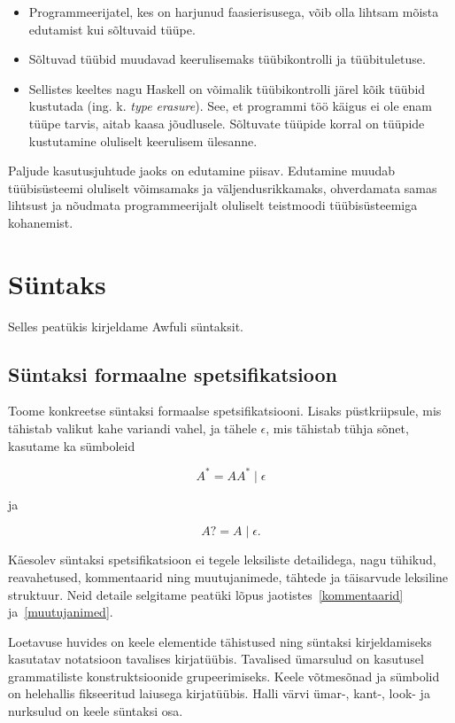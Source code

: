 \documentclass[12pt]{article}
\newcommand\peatykk[1]{
  \clearpage
  \section{#1}}
\begin{document}
      \begin{itemize}
        \item
          Programmeerijatel, kes on harjunud faasierisusega, võib olla lihtsam mõista edutamist kui sõltuvaid tüüpe.
        \item
          Sõltuvad tüübid muudavad keerulisemaks tüübikontrolli ja tüübituletuse.
        \item
          Sellistes keeltes nagu Haskell on võimalik tüübikontrolli järel kõik tüübid kustutada (ing. k. \textit{type erasure}). See, et programmi töö käigus ei ole enam tüüpe tarvis, aitab kaasa jõudlusele. Sõltuvate tüüpide korral on tüüpide kustutamine oluliselt keerulisem ülesanne.
      \end{itemize}

      Paljude kasutusjuhtude jaoks on edutamine piisav. Edutamine muudab tüübisüsteemi oluliselt võimsamaks ja väljendusrikkamaks, ohverdamata samas lihtsust ja nõudmata programmeerijalt oluliselt teistmoodi tüübisüsteemiga kohanemist.
  \peatykk{Süntaks}\label{syntaks}
    Selles peatükis kirjeldame Awfuli süntaksit.
    \subsection{Süntaksi formaalne spetsifikatsioon}
      Toome konkreetse süntaksi formaalse spetsifikatsiooni. Lisaks püstkriipsule, mis tähistab valikut kahe variandi vahel, ja tähele $\epsilon$, mis tähistab tühja sõnet, kasutame ka sümboleid

      \begin{equation*}
        A^*=AA^*\mid\epsilon
      \end{equation*}

      ja

      \begin{equation*}
        A?=A\mid\epsilon.
      \end{equation*}

      Käesolev süntaksi spetsifikatsioon ei tegele leksiliste detailidega, nagu tühikud, reavahetused, kommentaarid ning muutujanimede, tähtede ja täisarvude leksiline struktuur. Neid detaile selgitame peatüki lõpus jaotistes~\ref{kommentaarid} ja~\ref{muutujanimed}.

      Loetavuse huvides on keele elementide tähistused ning süntaksi kirjeldamiseks kasutatav notatsioon tavalises kirjatüübis. Tavalised ümarsulud on kasutusel grammatiliste konstruktsioonide grupeerimiseks. Keele võtmesõnad ja sümbolid on helehallis fikseeritud laiusega kirjatüübis. Halli värvi ümar-, kant-, look- ja nurksulud on keele süntaksi osa.
\end{document}
